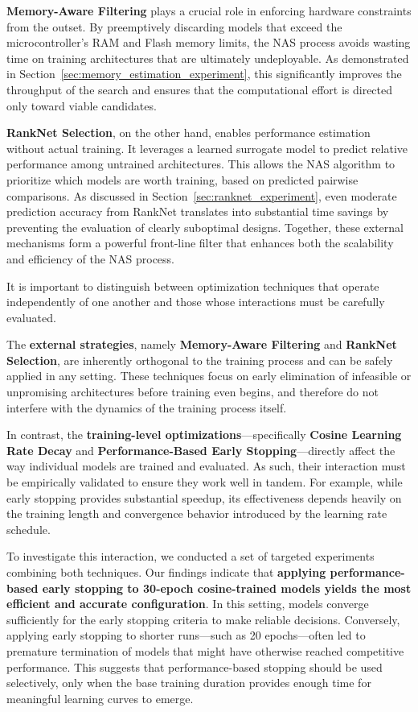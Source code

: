 \textbf{Memory-Aware Filtering} plays a crucial role in enforcing hardware constraints from the outset. By preemptively discarding models that exceed the microcontroller's RAM and Flash memory limits, the NAS process avoids wasting time on training architectures that are ultimately undeployable. As demonstrated in Section~\ref{sec:memory_estimation_experiment}, this significantly improves the throughput of the search and ensures that the computational effort is directed only toward viable candidates.

\textbf{RankNet Selection}, on the other hand, enables performance estimation without actual training. It leverages a learned surrogate model to predict relative performance among untrained architectures. This allows the NAS algorithm to prioritize which models are worth training, based on predicted pairwise comparisons. As discussed in Section~\ref{sec:ranknet_experiment}, even moderate prediction accuracy from RankNet translates into substantial time savings by preventing the evaluation of clearly suboptimal designs. Together, these external mechanisms form a powerful front-line filter that enhances both the scalability and efficiency of the NAS process.

It is important to distinguish between optimization techniques that operate independently of one another and those whose interactions must be carefully evaluated. 

The \textbf{external strategies}, namely \textbf{Memory-Aware Filtering} and \textbf{RankNet Selection}, are inherently orthogonal to the training process and can be safely applied in any setting. These techniques focus on early elimination of infeasible or unpromising architectures before training even begins, and therefore do not interfere with the dynamics of the training process itself.

In contrast, the \textbf{training-level optimizations}—specifically \textbf{Cosine Learning Rate Decay} and \textbf{Performance-Based Early Stopping}—directly affect the way individual models are trained and evaluated. As such, their interaction must be empirically validated to ensure they work well in tandem. For example, while early stopping provides substantial speedup, its effectiveness depends heavily on the training length and convergence behavior introduced by the learning rate schedule.

To investigate this interaction, we conducted a set of targeted experiments combining both techniques. Our findings indicate that \textbf{applying performance-based early stopping to 30-epoch cosine-trained models yields the most efficient and accurate configuration}. In this setting, models converge sufficiently for the early stopping criteria to make reliable decisions. Conversely, applying early stopping to shorter runs—such as 20 epochs—often led to premature termination of models that might have otherwise reached competitive performance. This suggests that performance-based stopping should be used selectively, only when the base training duration provides enough time for meaningful learning curves to emerge.








